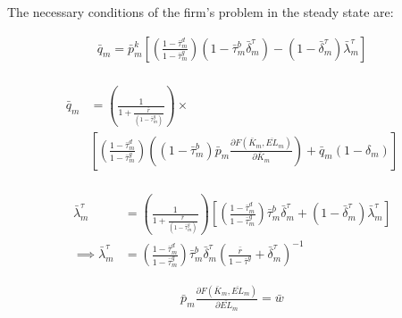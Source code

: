 \documentclass[letterpaper,12pt]{article}
\theoremstyle{definition}
\begin{document}
\begin{spacing}{1.5}
The necessary conditions of the firm's problem in the steady state are:

\begin{equation}
\label{eqn:lagrange_foc_i_tax_ss}
\begin{split}
  \bar{q}_{m} = \bar{p}^{k}_{m}\left[\left(\frac{1-\bar{\tau}^{d}_{m}}{1-\bar{\tau}^{g}_{m}}\right)(1-\bar{\tau}^{b}_{m}\bar{\delta}^{\tau}_{m}) - (1-\bar{\delta}^{\tau}_{m})\bar{\lambda}^{\tau}_{m} \right]  \\
\end{split}
\end{equation}


\begin{equation}
\label{eqn:lagrange_foc_k_tax_ss}
\begin{split}
 \bar{q}_{m} &=  \left(\frac{1}{1+\frac{\bar{r}}{(1-\bar{\tau}^{g}_{m})}}\right) \times  \\
& \left[\left(\frac{1-\bar{\tau}^{d}_{m}}{1-\bar{\tau}^{g}_{m}}\right)\left((1-\bar{\tau}^{b}_{m})\bar{p}_{m}\frac{\partial F(\bar{K}_{m},\overline{EL}_{m})}{\partial \bar{K}_{m}}\right) + \bar{q}_{m}(1-\delta_{m}) \right]  \\
\end{split}
\end{equation}

\begin{equation}
\label{eqn:lagrange_foc_ktau_tax_ss}
\begin{split}
\bar{\lambda}^{\tau}_{m} &=  \left(\frac{1}{1+\frac{\bar{r}}{(1-\bar{\tau}^{g}_{m})}}\right) \left[ \left(\frac{1-\bar{\tau}^{d}_{m}}{1-\bar{\tau}^{g}_{m}}\right)\bar{\tau}^{b}_{m}\bar{\delta}^{\tau}_{m} + (1-\bar{\delta}^{\tau}_{m})\bar{\lambda}^{\tau}_{m}\right]  \\
\implies \bar{\lambda}^{\tau}_{m} &=\left(\frac{1-\bar{\tau}^{d}_{m}}{1-\bar{\tau}^{g}_{m}}\right)\bar{\tau}^{b}_{m}\bar{\delta}^{\tau}_{m}\left(\frac{\bar{r}}{1-\bar{\tau}^{g}}+\bar{\delta}^{\tau}_{m}\right)^{-1}
\end{split}
\end{equation}

\begin{equation}
\label{eqn:lagrange_foc_l_tax_ss}
\begin{split}
  \bar{p}_{m}\frac{\partial F(\bar{K}_{m},\overline{EL}_{m})}{\partial \overline{EL}_{m}} = \bar{w}  \\
\end{split}
\end{equation}



\end{spacing}
\end{document}
